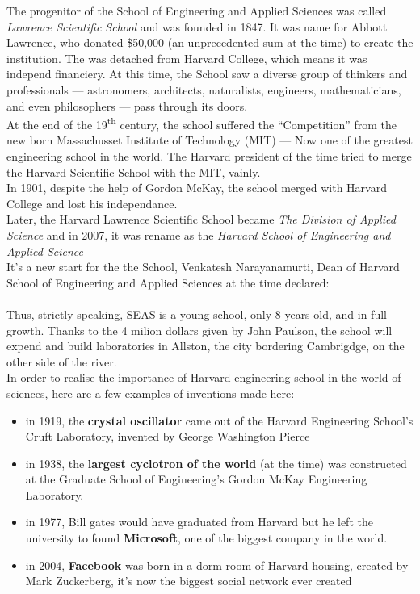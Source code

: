 \documentclass[10pt,a4paper]{article}
\begin{document}
The progenitor of the School of Engineering and Applied Sciences was called \textit{Lawrence Scientific School} and was founded in 1847. It was name for Abbott Lawrence, who donated \$50,000 (an unprecedented sum at the time) to create the institution. The was detached from Harvard College, which means it was independ financiery.
At this time, the School saw a diverse group of thinkers and professionals — astronomers, architects, naturalists, engineers, mathematicians, and even philosophers — pass through its doors.\\
At the end of the 19\textsuperscript{th} century, the school suffered the ``Competition'' from the new born Massachusset Institute of Technology (MIT) — Now one of the greatest engineering school in the world. The Harvard president of the time tried to merge the Harvard Scientific School with the MIT, vainly.\\
In 1901, despite the help of Gordon McKay, the school merged with Harvard College and lost his independance.\\

Later, the Harvard Lawrence Scientific School became \textit{The Division of Applied Science} and in 2007, it was rename as the \textit{Harvard School of Engineering and Applied Science}\\
It's a new start for the the School, Venkatesh Narayanamurti, Dean of Harvard School of Engineering and Applied Sciences at the time declared:\\
\\

Thus, strictly speaking, SEAS is a young school, only 8 years old, and in full growth. Thanks to the 4 milion dollars given by John Paulson, the school will expend and build laboratories in Allston, the city bordering Cambrigdge, on the other side of the river.\\

In order to realise the importance of Harvard engineering school in the world of sciences, here are a few examples of inventions made here:
\begin{itemize}
\item in 1919, the \textbf{crystal oscillator} came out of the Harvard Engineering School’s Cruft Laboratory, invented by George Washington Pierce
\item in 1938, the \textbf{largest cyclotron of the world} (at the time) was constructed at the Graduate School of Engineering's Gordon McKay Engineering Laboratory.
\item in 1977, Bill gates would have graduated from Harvard but he left the university  to found \textbf{Microsoft}, one of the biggest company in the world.
\item in 2004, \textbf{Facebook} was born in a dorm room of Harvard housing, created by Mark Zuckerberg, it's now the biggest social network ever created
\end{itemize}
\end{document}
